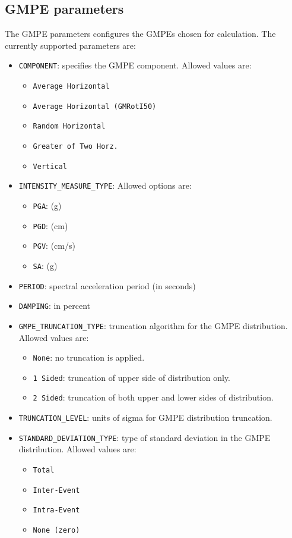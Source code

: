 \subsection{GMPE parameters}
The GMPE parameters configures the GMPEs chosen for calculation. The currently supported parameters are:
\begin{itemize}
\item \Verb+COMPONENT+: specifies the GMPE component. Allowed values are:
\begin{itemize}
\item \Verb+Average Horizontal+
\item \Verb+Average Horizontal (GMRotI50)+
\item \Verb+Random Horizontal+
\item \Verb+Greater of Two Horz.+
\item \Verb+Vertical+
\end{itemize}
\item \Verb+INTENSITY_MEASURE_TYPE+: Allowed options are:
\begin{itemize}
\item \Verb+PGA+: (g)
\item \Verb+PGD+: (cm)
\item \Verb+PGV+: (cm/s)
\item \Verb+SA+: (g)
\end{itemize}
\item \Verb+PERIOD+: spectral acceleration period (in seconds)
\item \Verb+DAMPING+: in percent
\item \Verb+GMPE_TRUNCATION_TYPE+: truncation algorithm for the GMPE distribution. Allowed values are:
\begin{itemize}
\item \Verb+None+: no truncation is applied.
\item \Verb+1 Sided+: truncation of upper side of distribution only.
\item \Verb+2 Sided+: truncation of both upper and lower sides of distribution.
\end{itemize}
\item \Verb+TRUNCATION_LEVEL+: units of sigma for GMPE distribution truncation.
\item \Verb+STANDARD_DEVIATION_TYPE+: type of standard deviation in the GMPE distribution. Allowed values are:
\begin{itemize}
\item \Verb+Total+
\item \Verb+Inter-Event+
\item \Verb+Intra-Event+
\item \Verb+None (zero)+
\end{itemize}
\end{itemize}

